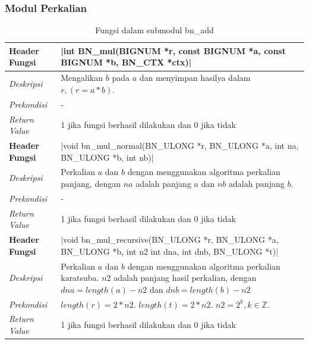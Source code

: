     \subsubsection{Modul Perkalian}
      \begin{table}[h]
        \caption{Fungsi dalam submodul bn\_add}
        \begin{tabular}{R{2.8cm}L{10.5cm}}
          \toprule
          \textbf{Header Fungsi} & |int BN_mul(BIGNUM *r, const BIGNUM *a, const BIGNUM *b, BN_CTX *ctx)|                                                                                                \\ \midrule
          \textit{Deskripsi}     & Mengalikan $b$ pada $a$ dan menyimpan hasilya dalam $r, (r = a * b)$.                                                                                                 \\
          \textit{Prekondisi}    & -                                                                                                                                                                     \\
          \textit{Return Value}  & 1 jika fungsi berhasil dilakukan dan 0 jika tidak
          \\ \bottomrule
          \textbf{Header Fungsi} & |void bn_mul_normal(BN_ULONG *r, BN_ULONG *a, int na, BN_ULONG *b, int nb)|                                                                                           \\ \midrule
          \textit{Deskripsi}     & Perkalian $a$ dan $b$ dengan menggunakan algoritma perkalian panjang, dengan $na$ adalah panjang $a$ dan $nb$ adalah panjang $b$.                                     \\
          \textit{Prekondisi}    & -                                                                                                                                                                     \\
          \textit{Return Value}  & 1 jika fungsi berhasil dilakukan dan 0 jika tidak
          \\ \bottomrule
          \textbf{Header Fungsi} & |void bn_mul_recursive(BN_ULONG *r, BN_ULONG *a, BN_ULONG *b, int n2 int dna, int dnb, BN_ULONG *t)|                                                                  \\ \midrule
          \textit{Deskripsi}     & Perkalian $a$ dan $b$ dengan menggunakan algoritma perkalian karatsuba. $n2$ adalah panjang hasil perkalian, dengan $dna = length(a) - n2$ dan $dnb = length(b) - n2$ \\
          \textit{Prekondisi}    & $length(r) = 2*n2$. $ length(t) = 2*n2$. $n2 = 2^k, k \in \mathbb{Z}. $                                                                                               \\
          \textit{Return Value}  & 1 jika fungsi berhasil dilakukan dan 0 jika tidak
          \\ \bottomrule
        \end{tabular}

      \end{table}

